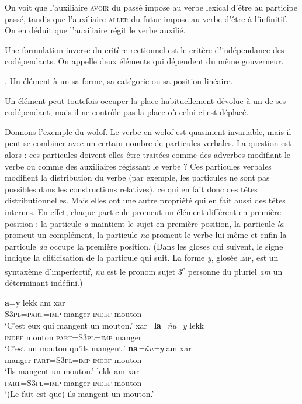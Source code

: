 On voit que l’auxiliaire \textsc{avoir} du passé impose au verbe lexical d’être au participe passé, tandis que l’auxiliaire \textsc{aller} du futur impose au verbe d’être à l’infinitif. On en déduit que l’auxiliaire régit le verbe auxilié.

Une formulation inverse du critère rectionnel est le critère d’indépendance des codépendants. On appelle  deux éléments qui dépendent du même gouverneur.

{. Un élément  à un  sa forme, sa catégorie ou sa position linéaire.}

Un élément peut toutefois occuper la place habituellement dévolue à un de ses codépendant, mais il ne contrôle pas la place où celui-ci est déplacé.

Donnons l’exemple du wolof. Le verbe en wolof est quasiment invariable, mais il peut se combiner avec un certain nombre de particules verbales. La question est alors : ces particules doivent-elles être traitées comme des adverbes modifiant le verbe ou comme des auxiliaires régissant le verbe ? Ces particules verbales modifient la distribution du verbe (par exemple, les particules ne sont pas possibles dans les constructions relatives), ce qui en fait donc des têtes distributionnelles. Mais elles ont une autre propriété qui en fait aussi des têtes internes. En effet, chaque particule promeut un élément différent en première position : la particule \textit{a} maintient le sujet en première position, la particule \textit{la} promeut un complément, la particule \textit{na} promeut le verbe lui-même et enfin la particule \textit{da} occupe la première position. (Dans les gloses qui suivent, le signe = indique la cliticisation de la particule qui suit. La forme \textit{y}, glosée \textsc{imp}, est un syntaxème d'imperfectif, \textit{ñu} est le pronom sujet 3\textsuperscript{e} personne du pluriel \textit{am} un déterminant indéfini.)

\ea
\ea
{}\textbf{{a}}{=y}                {lekk}          {am}       {xar~}\\
\textsc{S3pl=part=imp} manger  \textsc{indef}  mouton\\
\glt `C’est eux qui mangent un mouton.’
\ex
{}       {xar~}          \textbf{{la}}\textit{=ñu=y}               {lekk}\\
\textsc{indef}  mouton  \textsc{part=S3pl=imp} manger\\
\glt `C’est un mouton qu’ils mangent.’
\ex
{}       \textbf{{na}}\textit{=ñu=y}             {am}       {xar~}\\
manger  \textsc{part=S3pl=imp} \textsc{indef}  mouton\\
\glt `Ils mangent un mouton.’
\ex
{}   lekk         am      xar\\
\textsc{part=S3pl=imp}    manger  \textsc{indef}  mouton\\
\glt `(Le fait est que) ils mangent un mouton.’
\z
\z

